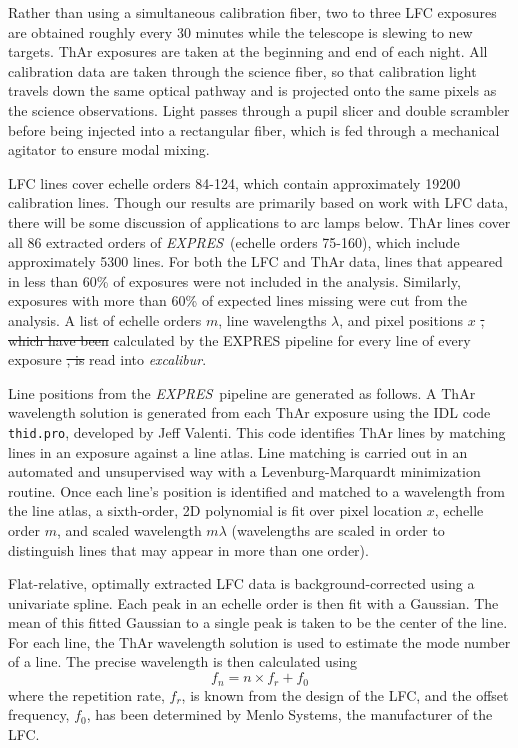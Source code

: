 \documentclass[twocolumn,table,xcolor,trackchanges]{aastex63} %
\newcommand{\project}[1]{\textsl{#1}}
\newcommand{\name}{\project{excalibur}}
\newcommand{\acronym}[1]{{\small{#1}}}
\newcommand{\expres}{\project{\acronym{EXPRES}}}
\providecommand{\DIFadd}[1]{{\protect\color{blue}\uwave{#1}}} %
\providecommand{\DIFdel}[1]{{\protect\color{red}\sout{#1}}}                      %
\providecommand{\DIFaddbegin}{} %
\providecommand{\DIFaddend}{} %
\providecommand{\DIFdelbegin}{} %
\providecommand{\DIFdelend}{} %
\begin{document}
Rather than using a simultaneous calibration fiber, two to three LFC exposures are obtained roughly every 30 minutes while the telescope is slewing to new targets.  ThAr exposures are taken at the beginning and end of each night.  All calibration data are taken through the science fiber, so that calibration light travels down the same optical pathway and is projected onto the same pixels as the science observations.  Light passes through a pupil slicer and double scrambler before being injected into a rectangular fiber, which is fed through a mechanical agitator to ensure modal mixing\citep{petersburg2018}.

LFC lines cover echelle orders 84-124, which contain approximately 19200 calibration lines.  Though our results are primarily based on work with LFC data, there will be some discussion of applications to arc lamps below.   ThAr lines cover all 86 extracted orders of \expres\ (echelle orders 75-160), which include approximately 5300 lines.  For both the LFC and ThAr data, lines that appeared in less than 60\% of exposures were not included in the analysis.  Similarly, exposures with more than 60\% of expected lines missing were cut from the analysis.  A list of echelle orders $m$, line wavelengths $\lambda$, and pixel positions $x$ \DIFdelbegin \DIFdel{, which have been }\DIFdelend \DIFaddbegin \DIFadd{were }\DIFaddend calculated by the EXPRES pipeline \citep{petersburg2020} for every line of every exposure \DIFdelbegin \DIFdel{, is }\DIFdelend \DIFaddbegin \DIFadd{and }\DIFaddend read into \name.

Line positions from the \expres\ pipeline are generated as follows.  A ThAr wavelength solution is generated from each ThAr exposure using the IDL code \texttt{thid.pro}, developed by Jeff Valenti.  This code identifies ThAr lines by matching lines in an exposure against a line atlas.  Line matching is carried out in an automated and unsupervised way with a Levenburg-Marquardt minimization routine.  Once each line's position is identified and matched to a wavelength from the line atlas, a sixth-order, 2D polynomial is fit over pixel location $x$, echelle order $m$, and scaled wavelength $m\lambda$ (wavelengths are scaled in order to distinguish lines that may appear in more than one order).

 Flat-relative, optimally extracted LFC data is background-corrected using a univariate spline.  Each peak in an echelle order is then fit with a Gaussian.  The mean of this fitted Gaussian to a single peak is taken to be the center of the line.  For each line, the ThAr wavelength solution is used to estimate the mode number of a line.  The precise wavelength is then calculated using
 \begin{equation}
 f_n = n \times  f_r + f_0
 \label{eq:lfc}
 \end{equation}
 where the repetition rate, $f_r$, is known from the design of the LFC, and the offset frequency, $f_0$, has been determined by Menlo Systems, the manufacturer of the LFC.
\end{document}
